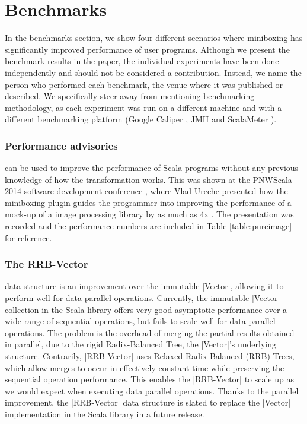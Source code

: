 

\section{Benchmarks}
\label{sec:bench}

In the benchmarks section, we show four different scenarios where miniboxing has significantly improved performance of user programs. Although we present the benchmark results in the paper, the individual experiments have been done independently and should not be considered a contribution. Instead, we name the person who performed each benchmark, the venue where it was published or described. We specifically steer away from mentioning benchmarking methodology, as each experiment was run on a different machine and with a different benchmarking platform (Google Caliper \cite{google-caliper}, JMH \cite{jmh} and ScalaMeter \cite{scalameter}).

\subsubsection{Performance advisories} can be used to improve the performance of Scala programs without any previous knowledge of how the transformation works. This was shown at the PNWScala 2014 software development conference \cite{pnwscala-conf}, where Vlad Ureche presented how the miniboxing plugin guides the programmer into improving the performance of a mock-up of a image processing library by as much as 4x \cite{pnwscala-pureimage}. The presentation was recorded and the performance numbers are included in Table \ref{table:pureimage} for reference.

\subsubsection{The RRB-Vector} data structure \cite{rrb-vector-paper} \cite{nicolas-thesis} is an improvement over the immutable |Vector|, allowing it to perform well for data parallel operations. Currently, the immutable |Vector| collection in the Scala library offers very good asymptotic performance over a wide range of sequential operations, but fails to scale well for data parallel operations. The problem is the overhead of merging the partial results obtained in parallel, due to the rigid Radix-Balanced Tree, the |Vector|'s underlying structure. Contrarily, |RRB-Vector| uses Relaxed Radix-Balanced (RRB) Trees, which allow merges to occur in effectively constant time while preserving the sequential operation performance. This enables the |RRB-Vector| to scale up as we would expect when executing data parallel operations. Thanks to the parallel improvement, the |RRB-Vector| data structure is slated to replace the |Vector| implementation in the Scala library in a future release. 

